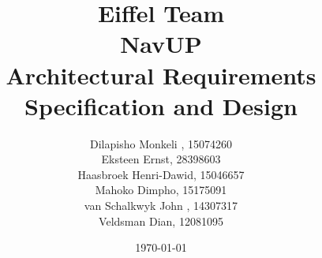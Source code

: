 \documentclass[12pt]{article}
\begin{document}
	\title{\Huge Eiffel Team \\ NavUP \\ Architectural Requirements Specification and Design}
	\author{\Large Dilapisho Monkeli , 15074260 \\
		\Large Eksteen Ernst, 28398603 \\
		\Large Haasbroek Henri-Dawid, 15046657 \\
		\Large Mahoko  Dimpho, 15175091 \\
		\Large van Schalkwyk John  , 14307317 \\
		\Large Veldsman Dian, 12081095}
	\date{\today}
	\maketitle
\end{document}
